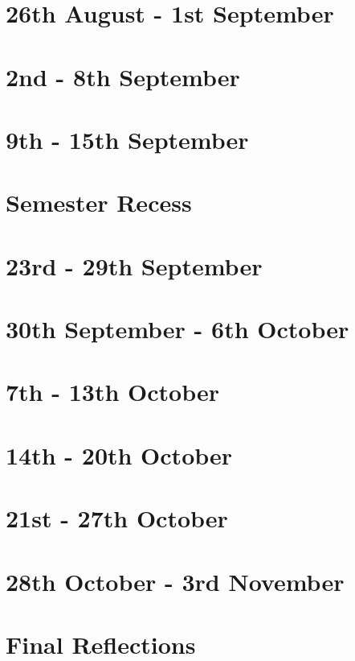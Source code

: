 \documentclass{article}
\begin{document}
\section{26th August - 1st September}

\section{2nd - 8th September}

\section{9th - 15th September}

\section*{Semester Recess}

\section{23rd - 29th September}

\section{30th September - 6th October}

\section{7th - 13th October}

\section{14th - 20th October}

\section{21st - 27th October}

\section{28th October - 3rd November}

\section*{Final Reflections}
\end{document}
